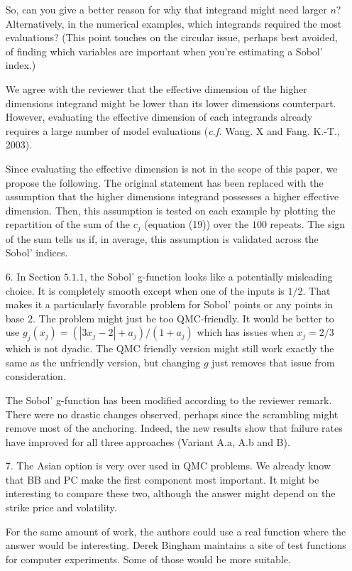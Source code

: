 \documentclass[10pt,a4paper]{article}
\begin{document}
\begin{itemize}
So, can you give a better reason for why that integrand might need larger $n$? Alternatively, in the numerical examples, which integrands required the most evaluations?
(This point touches on the circular issue, perhaps best avoided, of finding which variables are important when you're estimating a Sobol' index.)

{\color{blue} We agree with the reviewer that the effective dimension of the higher dimensions integrand might be lower than its lower dimensions counterpart. However, evaluating the effective dimension of each integrands already requires a large number of model evaluations (\textit{c.f.} Wang. X and Fang. K.-T., 2003).

Since evaluating the effective dimension is not in the scope of this paper, we propose the following. The original statement has been replaced with the assumption that the higher dimensions integrand possesses a higher effective dimension. Then, this assumption is tested on each example by plotting the repartition of the sum of the $c_j$ (equation (19)) over the $100$ repeats. The sign of the sum tells us if, in average, this assumption is validated across the Sobol' indices.}


\item[6.] In Section $5.1.1$, the Sobol' g-function looks like a potentially misleading choice. It is completely smooth except when one of the inputs is $1/2$.
That makes it a particularly favorable problem for Sobol' points or any points in base $2$. The problem might just be too QMC-friendly. It would be better to use $g_j(x_j) = (|3x_j-2| + a_j)/(1 + a_j)$ which has issues when
$x_j = 2/3$ which is not dyadic. The QMC friendly version might still work exactly the same as the unfriendly version, but changing $g$ just removes that issue from consideration.

{\color{blue} The Sobol' g-function has been modified according to the reviewer remark. There were no drastic changes observed, perhaps since the scrambling might remove most of the anchoring. Indeed, the new results show that failure rates have improved for all three approaches (Variant A.a, A.b and B).} 

\item[7.] The Asian option is very over used in QMC problems. We already know that BB and PC make the first component most important. It might be interesting to compare these two, although the answer might depend on
the strike price and volatility. 

For the same amount of work, the authors could use a real function where the answer would be interesting. Derek Bingham maintains a site of test functions for computer experiments. Some of those would be more suitable.


\end{itemize}
\end{document}
